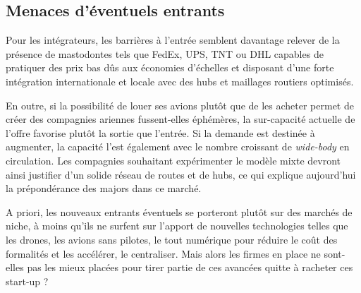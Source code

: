 \subsection{Menaces d'éventuels entrants}

Pour les intégrateurs, les barrières à l'entrée semblent davantage relever de la présence de mastodontes tels que FedEx, UPS, TNT ou DHL capables de pratiquer des prix bas dûs aux économies d'échelles et disposant d'une forte intégration internationale et locale avec des hubs et maillages routiers optimisés. 


En outre, si la possibilité de louer ses avions plutôt que de les acheter permet de créer des compagnies ariennes fussent-elles éphémères, la sur-capacité actuelle de l'offre favorise plutôt la sortie que l'entrée. Si la demande est destinée à augmenter, la capacité l'est également avec le nombre croissant de \textit{wide-body} en circulation. Les compagnies souhaitant expérimenter le modèle mixte devront ainsi justifier d'un solide réseau de routes et de hubs, ce qui explique aujourd'hui la prépondérance des majors dans ce marché.  

A priori, les nouveaux entrants éventuels se porteront plutôt sur des marchés de niche, à moins qu'ils ne surfent sur l'apport de nouvelles technologies telles que les drones, les avions sans pilotes, le tout numérique pour réduire le coût des formalités et les accélérer, le centraliser. Mais alors les firmes en place ne sont-elles pas les mieux placées pour tirer partie de ces avancées quitte à racheter ces start-up ?